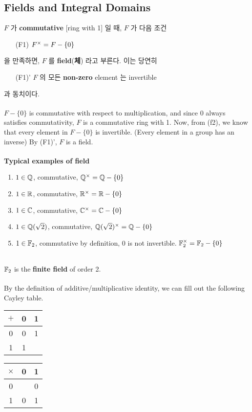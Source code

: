 \subsection{Fields and Integral Domains}
 $F$ 가 \textbf{commutative} [ring with 1] 일 때, $F$ 가 다음 조건
\begin{enumerate}
	\item[{\sffamily (F1)}] $F^\times = F - \{0\}$
\end{enumerate}
을 만족하면, $F$ 를 \textbf{field}(\textbf{체}) 라고 부른다. 이는 당연히
\begin{enumerate}
	\item[\sffamily (F1)'] $F$ 의 모든 \textbf{non-zero} element 는 invertible
\end{enumerate}
과 동치이다.\\
\\
 $F - \{0\}$ is commutative with respect to multiplication, and since $0$ always satisfies commutativity, $F$ is a commutative ring with 1. Now, from {\sffamily (f2)}, we know that every element in $F - \{0\}$ is invertible. (Every element in a group has an inverse) By {\sffamily (F1)'}, $F$ is a field.\\
\\
 \textbf{Typical examples of field}
\begin{enumerate} 
	\item $1\in \mathbb{Q}$, commutative, $\mathbb{Q}^\times = \mathbb{Q} - \{0\}$
	\item $1\in \mathbb{R}$, commutative, $\mathbb{R}^\times = \mathbb{R} - \{0\}$
	\item $1\in \mathbb{C}$, commutative, $\mathbb{C}^\times = \mathbb{C} - \{0\}$
	\item $1\in \mathbb{Q}(\sqrt{2})$, commutative, $\mathbb{Q}(\sqrt{2})^\times = \mathbb{Q} - \{0\}$
	\item $1\in \mathbb{F}_2$, commutative by definition, 0 is not invertible. $\mathbb{F}_2^\times = \mathbb{F}_2 - \{0\}$
\end{enumerate}~
\\
$\mathbb{F}_2$ is the \textbf{finite field} of order 2.\\
\\
 By the definition of additive/multiplicative identity, we can fill out the following Cayley table.
\begin{center}
	\begin{tabular}{c|cc}
		$+$ & 0 & 1 \\ \hline
		0 & 0 & 1\\
		1 & 1 & \\
	\end{tabular} \qquad
	\begin{tabular}{c|cc}
		$\times$ & 0 & 1 \\ \hline
		0 & & 0\\
		1 & 0 & 1\\
	\end{tabular}
\end{center}
